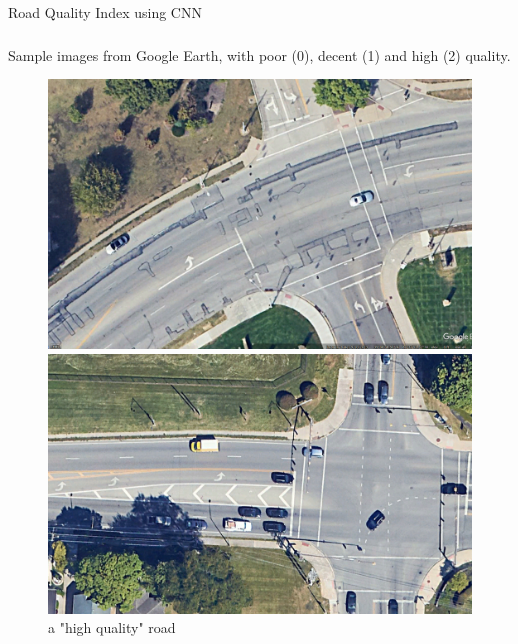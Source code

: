 \documentclass{beamer}
\begin{document}
\begin{frame}{Road Quality Index using CNN}
    \frametitle{}
    Sample images from Google Earth, with poor (0), decent (1) and high (2) quality.

    \begin{figure}[htbp]
        \centering
        \begin{minipage}[b]{0.49\textwidth}
            \centering
            \includegraphics[width=\textwidth]{assets/imgs/mlk_bad.png}
            \caption{a "poor quality" road}
            \label{fig:image1}
        \end{minipage}
        \hfill
        \begin{minipage}[b]{0.49\textwidth}
            \centering
            \includegraphics[width=\textwidth]{assets/imgs/road_good.png}
            \caption{a "high quality" road}
            \label{fig:image2}
        \end{minipage}
    \end{figure}
    

\end{frame}
     
\end{document}
